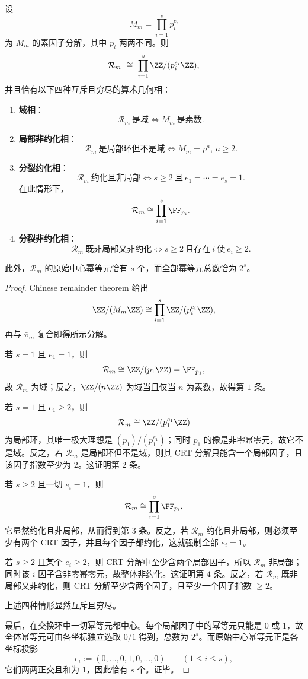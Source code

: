 \begin{theorem}[折叠同余半环的四相算术几何分类]\label{thm:xi-fold-congruence-crt-primitive-idempotents}
设
\[
M_m=\prod_{i=1}^{s}p_i^{e_i}
\]
为 \(M_m\) 的素因子分解，其中 \(p_i\) 两两不同。则
\[
\mathcal R_m\ \cong\ \prod_{i=1}^{s}\ZZ/(p_i^{e_i}\ZZ),
\]
并且恰有以下四种互斥且穷尽的算术几何相：
\begin{enumerate}
  \item \textbf{域相}：
  \[
  \mathcal R_m\ \text{是域}
  \iff
  M_m\ \text{是素数}.
  \]
  \item \textbf{局部非约化相}：
  \[
  \mathcal R_m\ \text{是局部环但不是域}
  \iff
  M_m=p^a,\ a\ge 2.
  \]
  \item \textbf{分裂约化相}：
  \[
  \mathcal R_m\ \text{约化且非局部}
  \iff
  s\ge 2\ \text{且}\ e_1=\cdots=e_s=1.
  \]
  在此情形下，
  \[
  \mathcal R_m\cong \prod_{i=1}^{s}\FF_{p_i}.
  \]
  \item \textbf{分裂非约化相}：
  \[
  \mathcal R_m\ \text{既非局部又非约化}
  \iff
  s\ge 2\ \text{且存在}\ i\ \text{使}\ e_i\ge 2.
  \]
\end{enumerate}
此外，\(\mathcal R_m\) 的原始中心幂等元恰有 \(s\) 个，而全部幂等元总数恰为 \(2^s\)。
\end{theorem}
\begin{proof}
Chinese remainder theorem 给出
\[
\ZZ/(M_m\ZZ)\cong \prod_{i=1}^{s}\ZZ/(p_i^{e_i}\ZZ),
\]
再与 \(\bar\pi_m\) 复合即得所示分解。

若 \(s=1\) 且 \(e_1=1\)，则
\[
\mathcal R_m\cong \ZZ/(p_1\ZZ)=\FF_{p_1},
\]
故 \(\mathcal R_m\) 为域；反之，\(\ZZ/(n\ZZ)\) 为域当且仅当 \(n\) 为素数，故得第 \(1\) 条。

若 \(s=1\) 且 \(e_1\ge 2\)，则
\[
\mathcal R_m\cong \ZZ/(p_1^{e_1}\ZZ)
\]
为局部环，其唯一极大理想是 \((p_1)/(p_1^{e_1})\)；同时 \(p_1\) 的像是非零幂零元，故它不是域。反之，若 \(\mathcal R_m\) 是局部环但不是域，则其 CRT 分解只能含一个局部因子，且该因子指数至少为 \(2\)。这证明第 \(2\) 条。

若 \(s\ge 2\) 且一切 \(e_i=1\)，则
\[
\mathcal R_m\cong \prod_{i=1}^{s}\FF_{p_i},
\]
它显然约化且非局部，从而得到第 \(3\) 条。反之，若 \(\mathcal R_m\) 约化且非局部，则必须至少有两个 CRT 因子，并且每个因子都约化，这就强制全部 \(e_i=1\)。

若 \(s\ge 2\) 且某个 \(e_i\ge 2\)，则 CRT 分解中至少含两个局部因子，所以 \(\mathcal R_m\) 非局部；同时该 \(i\)-因子含非零幂零元，故整体非约化。这证明第 \(4\) 条。反之，若 \(\mathcal R_m\) 既非局部又非约化，则 CRT 分解至少含两个因子，且至少一个因子指数 \(\ge 2\)。

上述四种情形显然互斥且穷尽。

最后，在交换环中一切幂等元都中心。每个局部因子中的幂等元只能是 \(0\) 或 \(1\)，故全体幂等元可由各坐标独立选取 \(0/1\) 得到，总数为 \(2^s\)。而原始中心幂等元正是各坐标投影
\[
e_i:=(0,\dots,0,1,0,\dots,0)
\qquad(1\le i\le s),
\]
它们两两正交且和为 \(1\)，因此恰有 \(s\) 个。证毕。
\end{proof}

